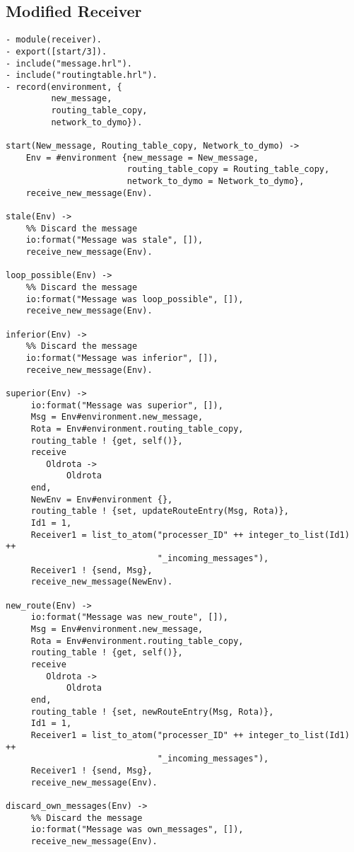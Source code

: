 \subsection*{Modified Receiver}

\footnotesize
\begin{verbatim}
- module(receiver).
- export([start/3]).
- include("message.hrl").
- include("routingtable.hrl").
- record(environment, {
         new_message,
         routing_table_copy,
         network_to_dymo}).

start(New_message, Routing_table_copy, Network_to_dymo) -> 
    Env = #environment {new_message = New_message, 
                        routing_table_copy = Routing_table_copy, 
                        network_to_dymo = Network_to_dymo},
    receive_new_message(Env).

stale(Env) -> 
    %% Discard the message
    io:format("Message was stale", []),
    receive_new_message(Env).

loop_possible(Env) -> 
    %% Discard the message
    io:format("Message was loop_possible", []),
    receive_new_message(Env).

inferior(Env) -> 
    %% Discard the message
    io:format("Message was inferior", []),
    receive_new_message(Env).

superior(Env) -> 
     io:format("Message was superior", []),
     Msg = Env#environment.new_message,
     Rota = Env#environment.routing_table_copy,
     routing_table ! {get, self()},
     receive 
        Oldrota -> 
            Oldrota
     end,
     NewEnv = Env#environment {},
     routing_table ! {set, updateRouteEntry(Msg, Rota)},
     Id1 = 1,
     Receiver1 = list_to_atom("processer_ID" ++ integer_to_list(Id1) ++ 
                              "_incoming_messages"),
     Receiver1 ! {send, Msg},
     receive_new_message(NewEnv).

new_route(Env) -> 
     io:format("Message was new_route", []),
     Msg = Env#environment.new_message,
     Rota = Env#environment.routing_table_copy,
     routing_table ! {get, self()},
     receive 
        Oldrota -> 
            Oldrota
     end,
     routing_table ! {set, newRouteEntry(Msg, Rota)},
     Id1 = 1,
     Receiver1 = list_to_atom("processer_ID" ++ integer_to_list(Id1) ++ 
                              "_incoming_messages"),
     Receiver1 ! {send, Msg},
     receive_new_message(Env).

discard_own_messages(Env) -> 
     %% Discard the message
     io:format("Message was own_messages", []),
     receive_new_message(Env).


\end{verbatim}
